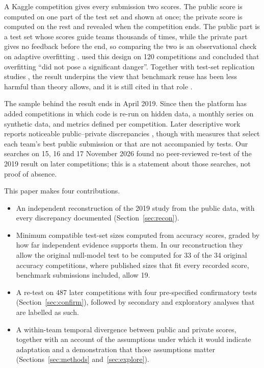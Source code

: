 \documentclass[10pt]{article}
\begin{document}
A Kaggle competition gives every submission two scores. The public score is computed on one part of the test set and shown at once; the private score is computed on the rest and revealed when the competition ends. The public part is a test set whose scores guide teams thousands of times, while the private part gives no feedback before the end, so comparing the two is an observational check on adaptive overfitting \citep{dwork2015reusable,blum2015ladder}. \citet{roelofs2019meta} used this design on 120 competitions and concluded that overfitting ``did not pose a significant danger''. Together with test-set replication studies \citep{recht2019imagenet,yadav2019cold}, the result underpins the view that benchmark reuse has been less harmful than theory allows, and it is still cited in that role \citep{sculley2025position}.

The sample behind the result ends in April 2019. Since then the platform has added competitions in which code is re-run on hidden data, a monthly series on synthetic data, and metrics defined per competition. Later descriptive work reports noticeable public--private discrepancies \citep{bonisch2025chronicles,burtch2026monoculture}, though with measures that select each team's best public submission or that are not accompanied by tests. Our searches on 15, 16 and 17 November 2026 found no peer-reviewed re-test of the 2019 result on later competitions; this is a statement about those searches, not proof of absence.

This paper makes four contributions.
\begin{itemize}
\item An independent reconstruction of the 2019 study from the public data, with every discrepancy documented (Section~\ref{sec:recon}).
\item Minimum compatible test-set sizes computed from accuracy scores, graded by how far independent evidence supports them. In our reconstruction they allow the original null-model test to be computed for 33 of the 34 original accuracy competitions, where published sizes that fit every recorded score, benchmark submissions included, allow 19.
\item A re-test on 487 later competitions with four pre-specified confirmatory tests (Section~\ref{sec:confirm}), followed by secondary and exploratory analyses that are labelled as such.
\item A within-team temporal divergence between public and private scores, together with an account of the assumptions under which it would indicate adaptation and a demonstration that those assumptions matter (Sections~\ref{sec:methods} and~\ref{sec:explore}).
\end{itemize}
\end{document}
